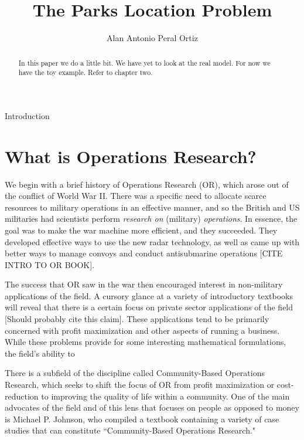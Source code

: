 \documentclass[12pt]{pom_thesis}
\author{Alan Antonio Peral Ortiz}
\title{The Parks Location Problem}
\begin{document}
\maketitle

\begin{abstract}In this paper we do a little bit.  We have yet to look at the real model. For now we have the toy example. Refer to chapter two.
\end{abstract}

\tableofcontents

\newpage
{}
\begin{chapter}{Introduction}
\label{Intro}
\section{What is Operations Research?}

	We begin with a brief history of Operations Research (OR), which arose out of the conflict of World War II. There was a specific need to allocate scarce resources to military operations in an effective manner, and so the British and US militaries had scientists perform \textit{research on} (military) \textit{operations}. In essence, the goal was to make the war machine more efficient, and they succeeded. They developed effective ways to use the new radar technology, as well as came up with better ways to manage convoys and conduct antisubmarine operations [CITE INTRO TO OR BOOK]. 
	
	The success that OR saw in the war then encouraged interest in non-military applications of the field.
	A cursory glance at a variety of introductory textbooks will reveal that there is a certain focus on private sector applications of the field [Should probably cite this claim]. These applications tend to be primarily concerned with profit maximization and other aspects of running a business. While these problems provide for some interesting mathematical formulations, the field's ability to 
	
	There is a subfield of the discipline called Community-Based Operations Research, which seeks to shift the focus of OR from profit maximization or cost-reduction to improving the quality of life within a community. One of the main advocates of the field and of this lens that focuses on people as opposed to money is Michael P. Johnson, who compiled a textbook containing a variety of case studies that can constitute ``Community-Based Operations Research." 
	

\end{chapter}
\end{document}
